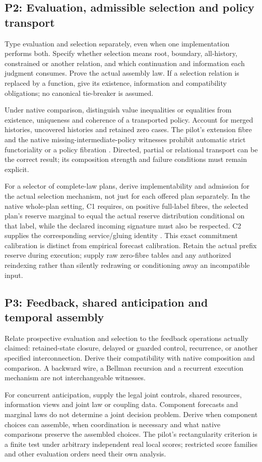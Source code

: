 \documentclass[11pt]{article}
\newcommand{\obligation}[2]{\subsection*{#1: #2}\hypertarget{#1}{}}
\begin{document}
\obligation{P2}{Evaluation, admissible selection and policy transport}
Type evaluation and selection separately, even when one implementation performs both. Specify whether selection means root, boundary, all-history, constrained or another relation, and which continuation and information each judgment consumes. Prove the actual assembly law. If a selection relation is replaced by a function, give its existence, information and compatibility obligations; no canonical tie-breaker is assumed.

Under native comparison, distinguish value inequalities or equalities from existence, uniqueness and coherence of a transported policy. Account for merged histories, uncovered histories and retained zero cases. The pilot's extension fibre and the native missing-intermediate-policy witnesses prohibit automatic strict functoriality or a policy fibration \cite{pilot,transport}. Directed, partial or relational transport can be the correct result; its composition strength and failure conditions must remain explicit.

For a selector of complete-law plans, derive implementability and admission for the actual selection mechanism, not just for each offered plan separately. In the native whole-plan setting, C1 requires, on positive full-label fibres, the selected plan's reserve marginal to equal the actual reserve distribution conditional on that label, while the declared incoming signature must also be respected. C2 supplies the corresponding service/gluing identity \cite{controllers}. This exact commitment calibration is distinct from empirical forecast calibration. Retain the actual prefix reserve during execution; supply raw zero-fibre tables and any authorized reindexing rather than silently redrawing or conditioning away an incompatible input.

\obligation{P3}{Feedback, shared anticipation and temporal assembly}
Relate prospective evaluation and selection to the feedback operations actually claimed: retained-state closure, delayed or guarded control, recurrence, or another specified interconnection. Derive their compatibility with native composition and comparison. A backward wire, a Bellman recursion and a recurrent execution mechanism are not interchangeable witnesses.

For concurrent anticipation, supply the legal joint controls, shared resources, information views and joint law or coupling data. Component forecasts and marginal laws do not determine a joint decision problem. Derive when component choices can assemble, when coordination is necessary and what native comparisons preserve the assembled choices. The pilot's rectangularity criterion is a finite test under arbitrary independent real local scores; restricted score families and other evaluation orders need their own analysis.
\end{document}
